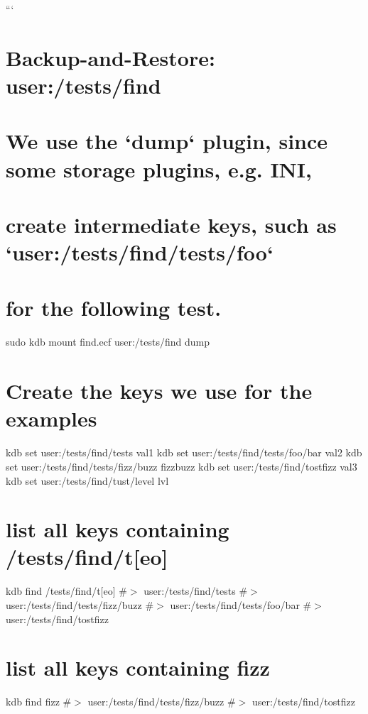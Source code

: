 ``` \hypertarget{doc_help_kdb-find_md_autotoc_md1796}{}\section{Backup-\/and-\/\+Restore\+: user\+:/tests/find}\label{doc_help_kdb-find_md_autotoc_md1796}
\hypertarget{doc_help_kdb-find_md_autotoc_md1797}{}\section{We use the `dump` plugin, since some storage plugins, e.\+g. I\+N\+I,}\label{doc_help_kdb-find_md_autotoc_md1797}
\hypertarget{doc_help_kdb-find_md_autotoc_md1798}{}\section{create intermediate keys, such as `user\+:/tests/find/tests/foo`}\label{doc_help_kdb-find_md_autotoc_md1798}
\hypertarget{doc_help_kdb-find_md_autotoc_md1799}{}\section{for the following test.}\label{doc_help_kdb-find_md_autotoc_md1799}
sudo kdb mount find.\+ecf user\+:/tests/find dump\hypertarget{doc_help_kdb-find_md_autotoc_md1800}{}\section{Create the keys we use for the examples}\label{doc_help_kdb-find_md_autotoc_md1800}
kdb set user\+:/tests/find/tests val1 kdb set user\+:/tests/find/tests/foo/bar val2 kdb set user\+:/tests/find/tests/fizz/buzz fizzbuzz kdb set user\+:/tests/find/tostfizz val3 kdb set user\+:/tests/find/tust/level lvl\hypertarget{doc_help_kdb-find_md_autotoc_md1801}{}\section{list all keys containing /tests/find/t\mbox{[}eo\mbox{]}}\label{doc_help_kdb-find_md_autotoc_md1801}
kdb find \textquotesingle{}/tests/find/t\mbox{[}eo\mbox{]}\textquotesingle{} \#$>$ user\+:/tests/find/tests \#$>$ user\+:/tests/find/tests/fizz/buzz \#$>$ user\+:/tests/find/tests/foo/bar \#$>$ user\+:/tests/find/tostfizz\hypertarget{doc_help_kdb-find_md_autotoc_md1802}{}\section{list all keys containing fizz}\label{doc_help_kdb-find_md_autotoc_md1802}
kdb find \textquotesingle{}fizz\textquotesingle{} \#$>$ user\+:/tests/find/tests/fizz/buzz \#$>$ user\+:/tests/find/tostfizz

